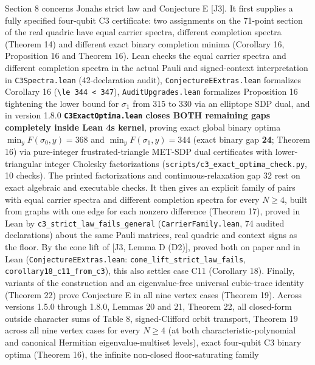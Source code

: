\documentclass[11pt,a4paper]{article}
\begin{document}
Section 8 concerns Jonah\textquotesingle s strict law and Conjecture E {[}J3{]}. It first supplies a fully specified
four-qubit C3 certificate: two assignments on the 71-point section of the real quadric have equal
carrier spectra, different completion spectra (Theorem 14) and different exact binary completion
minima (Corollary 16, Proposition 16\textquotesingle{} and Theorem 16\textquotesingle\textquotesingle). Lean checks the equal carrier spectra and
different completion spectra in the actual Pauli and signed-context interpretation in \texttt{C3Spectra.lean}
(42-declaration audit), \nolinkurl{ConjectureEExtras.lean} formalizes Corollary 16 (\texttt{\textbackslash{}le\ 344\ \textless{}\ 347}),
\nolinkurl{AuditUpgrades.lean} formalizes Proposition 16\textquotesingle{} tightening the lower bound for \(\sigma_1\) from 315 to
330 via an elliptope SDP dual, and in version 1.8.0 \textbf{\nolinkurl{C3ExactOptima.lean} closes BOTH remaining gaps
completely inside Lean 4\textquotesingle s kernel}, proving exact global binary optima
\textbf{\(\min_y F(\sigma_0,y) = 368\)} and \textbf{\(\min_y F(\sigma_1,y) = 344\)} (exact binary gap \textbf{24};
Theorem 16\textquotesingle\textquotesingle) via pure-integer frustrated-triangle MET-SDP dual certificates with lower-triangular
integer Cholesky factorizations (\nolinkurl{scripts/c3_exact_optima_check.py}, 10 checks). The printed
factorizations and continuous-relaxation gap 32 rest on exact algebraic and executable checks. It then
gives an explicit family of pairs with equal carrier spectra and different completion spectra for every
\(N\ge4\), built from graphs with one edge for each nonzero difference (Theorem 17), proved in Lean by
\nolinkurl{c3_strict_law_fails_general} (\nolinkurl{CarrierFamily.lean}, 74 audited declarations) about the same Pauli
matrices, real quadric and context signs as the floor. By the cone lift of {[}J3, Lemma D (D2){]}, proved
both on paper and in Lean (\nolinkurl{ConjectureEExtras.lean}: \nolinkurl{cone_lift_strict_law_fails},
\nolinkurl{corollary18_c11_from_c3}), this also settles case C11 (Corollary 18). Finally, variants of the
construction and an eigenvalue-free universal cubic-trace identity (Theorem 22) prove Conjecture E in all
nine vertex cases (Theorem 19). Across versions 1.5.0 through 1.8.0, Lemmas 20 and 21, Theorem 22, all
closed-form outside character sums of Table 8, signed-Clifford orbit transport, Theorem 19 across all nine
vertex cases for every \(N\ge4\) (at both characteristic-polynomial and canonical Hermitian eigenvalue-multiset
levels), exact four-qubit C3 binary optima (Theorem 16\textquotesingle\textquotesingle), the infinite non-closed floor-saturating family
\end{document}

